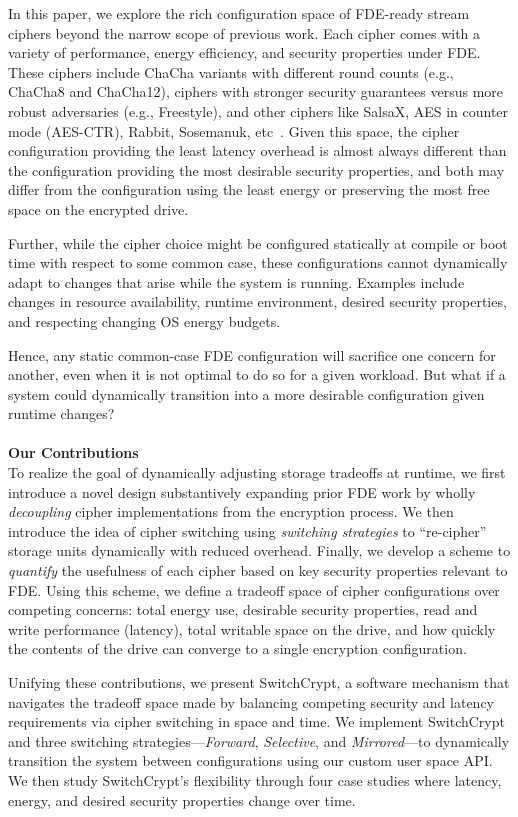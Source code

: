 In this paper, we explore the rich configuration space of FDE-ready stream
ciphers beyond the narrow scope of previous work. Each cipher comes with a
variety of performance, energy efficiency, and security properties under FDE.
These ciphers include ChaCha variants with different round counts (e.g., ChaCha8
and ChaCha12), ciphers with stronger security guarantees versus more robust
adversaries (e.g., Freestyle), and other ciphers like SalsaX, AES in counter
mode (AES-CTR), Rabbit, Sosemanuk, etc~\cite{Freestyle, SalsaX, Rabbit,
Sosemanuk, ChaCha20, AESCTR}. Given this space, the cipher configuration
providing the least latency overhead is almost always different than the
configuration providing the most desirable security properties, and both may
differ from the configuration using the least energy or preserving the most free
space on the encrypted drive.

Further, while the cipher choice might be configured statically at compile or
boot time with respect to some common case, these configurations cannot
dynamically adapt to changes that arise while the system is running. Examples
include changes in resource availability, runtime environment, desired security
properties, and respecting changing OS energy budgets.

Hence, any static common-case FDE configuration will sacrifice one concern for
another, even when it is not optimal to do so for a given workload. But what if
a system could dynamically transition into a more desirable configuration given
runtime changes?\\
\\
\textbf{Our Contributions}\\
To realize the goal of dynamically adjusting storage tradeoffs at runtime, we
first introduce a novel design substantively expanding prior FDE work by wholly
\emph{decoupling} cipher implementations from the encryption process. We then
introduce the idea of cipher switching using \emph{switching strategies} to
``re-cipher'' storage units dynamically with reduced overhead. Finally, we
develop a scheme to \emph{quantify} the usefulness of each cipher based on key
security properties relevant to FDE. Using this scheme, we define a tradeoff
space of cipher configurations over competing concerns: total energy use,
desirable security properties, read and write performance (latency), total
writable space on the drive, and how quickly the contents of the drive can
converge to a single encryption configuration.

Unifying these contributions, we present SwitchCrypt, a software mechanism that
navigates the tradeoff space made by balancing competing security and latency
requirements via cipher switching in space and time. We implement SwitchCrypt
and three switching strategies---\emph{Forward}, \emph{Selective}, and
\emph{Mirrored}---to dynamically transition the system between configurations
using our custom user space API. We then study SwitchCrypt's flexibility through
four case studies where latency, energy, and desired security properties change
over time.


